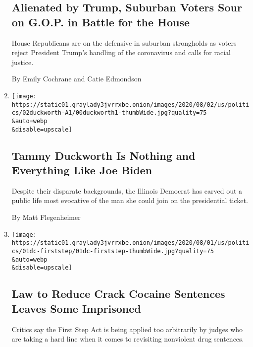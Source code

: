 \begin{enumerate}
{  \subsection{Alienated by Trump, Suburban Voters Sour on G.O.P. in
  Battle for the
  House}\label{alienated-by-trump-suburban-voters-sour-on-gop-in-battle-for-the-house-1}}

  House Republicans are on the defensive in suburban strongholds as
  voters reject President Trump's handling of the coronavirus and calls
  for racial justice.

  By Emily Cochrane and Catie Edmondson
\item
  \href{/2020/08/01/us/politics/tammy-duckworth-biden-vp.html}{}

  \texttt{[image: https://static01.graylady3jvrrxbe.onion/images/2020/08/02/us/politics/02duckworth-A1/00duckworth1-thumbWide.jpg?quality=75\\\&auto=webp\\\&disable=upscale]}

  \hypertarget{tammy-duckworth-is-nothing-and-everything-like-joe-biden-1}{%
  \subsection{Tammy Duckworth Is Nothing and Everything Like Joe
  Biden}\label{tammy-duckworth-is-nothing-and-everything-like-joe-biden-1}}

  Despite their disparate backgrounds, the Illinois Democrat has carved
  out a public life most evocative of the man she could join on the
  presidential ticket.

  By Matt Flegenheimer
\item
  \href{/2020/08/01/us/politics/law-to-reduce-crack-cocaine-sentences-leaves-some-imprisoned.html}{}

  \texttt{[image: https://static01.graylady3jvrrxbe.onion/images/2020/08/01/us/politics/01dc-firststep/01dc-firststep-thumbWide.jpg?quality=75\\\&auto=webp\\\&disable=upscale]}

  \hypertarget{law-to-reduce-crack-cocaine-sentences-leaves-some-imprisoned}{%
  \subsection{Law to Reduce Crack Cocaine Sentences Leaves Some
  Imprisoned}\label{law-to-reduce-crack-cocaine-sentences-leaves-some-imprisoned}}

  Critics say the First Step Act is being applied too arbitrarily by
  judges who are taking a hard line when it comes to revisiting
  nonviolent drug sentences.


\end{enumerate}
